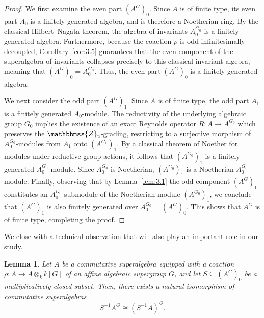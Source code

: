 \documentclass[11pt,a4paper,reqno,noamsfonts]{amsart}
\numberwithin{equation}{section}
\newtheorem{lemma}[theorem]{Lemma}
\theoremstyle{definition}
\theoremstyle{remark}
\newcommand{\ZZ}{\ensuremath{\mathbbmss{Z}}}
\begin{document}
\begin{proof}
We first examine the even part $(A^G)_0$. Since $A$ is of finite type, its even part $A_{0}$ is a finitely generated algebra, and is therefore a Noetherian ring. By the classical Hilbert--Nagata theorem, the algebra of invariants $A_{0}^{G_{0}}$ is a finitely generated algebra. Furthermore, because the coaction $\rho$ is odd-infinitesimally decoupled, Corollary~\ref{cor:3.5} guarantees that the even component of the superalgebra of invariants collapses precisely to this classical invariant algebra, meaning that $(A^G)_0 = A_0^{G_0}$. Thus, the even part $(A^G)_0$ is a finitely generated algebra.

We next consider the odd part $(A^{G})_1$. Since $A$ is of finite type, the odd part $A_1$ is a finitely generated $A_0$-module. The reductivity of the underlying algebraic group $G_0$ implies the existence of an exact Reynolds operator $R \colon A \to A^{G_0}$ which preserves the $\ZZ_{2}$-grading, restricting to a surjective morphism of $A_{0}^{G_{0}}$-modules from $A_1$ onto $(A^{G_0})_1$. By a classical theorem of Noether for modules under reductive group actions, it follows that $(A^{G_0})_1$ is a finitely generated $A_{0}^{G_{0}}$-module. Since $A_{0}^{G_{0}}$ is Noetherian, $(A^{G_0})_1$ is a Noetherian $A_{0}^{G_{0}}$-module. Finally, observing that by Lemma~\ref{lem:3.1} the odd component $(A^G)_1$ constitutes an $A_{0}^{G_{0}}$-submodule of the Noetherian module $(A^{G_0})_1$, we conclude that $(A^G)_1$ is also finitely generated over $A_0^{G_0} = (A^G)_0$. This shows that $A^{G}$ is of finite type, completing the proof.
\end{proof}

We close with a technical observation that will also play an important role in our study.

\begin{lemma}\label{lem:3.7}
Let $A$ be a commutative superalgebra equipped with a coaction $\rho \colon A \to A \otimes_k k[G]$ of an affine algebraic supergroup $G$, and let $S \subseteq (A^{G})_0$ be a multiplicatively closed subset. Then, there exists a natural isomorphism of commutative superalgebras
\begin{equation}
S^{-1} A^{G} \cong (S^{-1} A)^{G}.
\end{equation}
\end{lemma}
\end{document}
